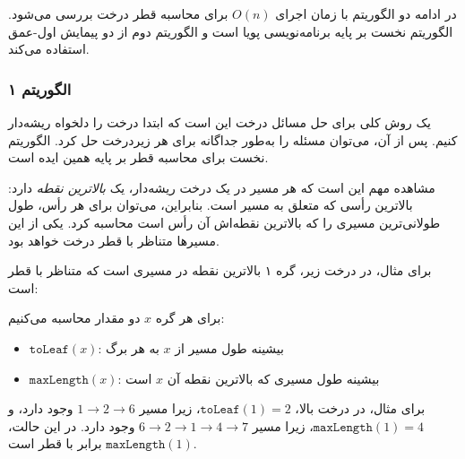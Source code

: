 در ادامه دو الگوریتم با زمان اجرای $O(n)$
برای محاسبه قطر درخت بررسی می‌شود.
الگوریتم نخست بر پایه برنامه‌نویسی پویا است
و الگوریتم دوم از دو پیمایش اول-عمق استفاده می‌کند.

\subsubsection{الگوریتم ۱}

یک روش کلی برای حل مسائل درخت
این است که ابتدا درخت را دلخواه ریشه‌دار کنیم.
پس از آن، می‌توان مسئله را
به‌طور جداگانه برای هر زیردرخت حل کرد.
الگوریتم نخست برای محاسبه قطر
بر پایه همین ایده است.

مشاهده مهم این است که هر مسیر
در یک درخت ریشه‌دار، یک \emph{بالاترین نقطه} دارد:
بالاترین رأسی که متعلق به مسیر است.
بنابراین، می‌توان برای هر رأس، طول
طولانی‌ترین مسیری را که بالاترین نقطه‌اش آن رأس است محاسبه کرد.
یکی از این مسیرها متناظر با قطر درخت خواهد بود.

برای مثال، در درخت زیر،
گره ۱ بالاترین نقطه در مسیری است
که متناظر با قطر است:
\begin{center}
\end{center}

برای هر گره $x$ دو مقدار محاسبه می‌کنیم:
\begin{itemize}
\item $\texttt{toLeaf}(x)$: بیشینه طول مسیر از $x$ به هر برگ
\item $\texttt{maxLength}(x)$: بیشینه طول مسیری
که بالاترین نقطه آن $x$ است
\end{itemize}
برای مثال، در درخت بالا،
$\texttt{toLeaf}(1)=2$، زیرا مسیر
$1 \rightarrow 2 \rightarrow 6$ وجود دارد،
و $\texttt{maxLength}(1)=4$،
زیرا مسیر
$6 \rightarrow 2 \rightarrow 1 \rightarrow 4 \rightarrow 7$ وجود دارد.
در این حالت، $\texttt{maxLength}(1)$ برابر با قطر است.

